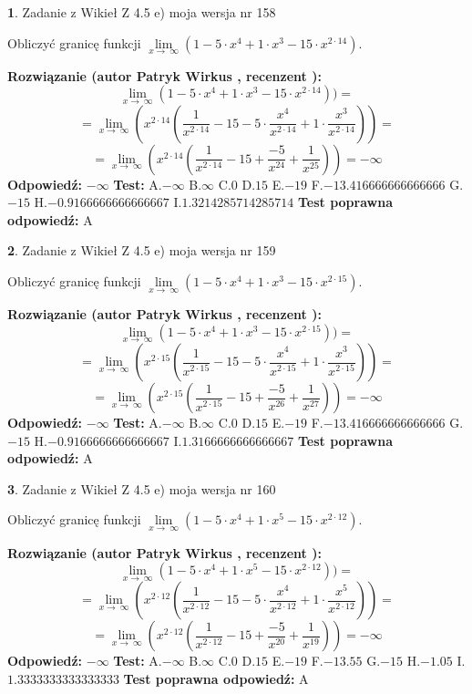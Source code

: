\documentclass[12pt, a4paper]{article}
\theoremstyle{definition} %
\newtheorem{zad}{}
\newcommand{\zadStart}[1]{\begin{zad}#1\newline}
\newcommand{\zadStop}{\end{zad}}
\newcommand{\rozwStart}[2]{\noindent \textbf{Rozwiązanie (autor #1 , recenzent #2): }\newline}
\newcommand{\rozwStop}{\newline}
\newcommand{\odpStart}{\noindent \textbf{Odpowiedź:}\newline}
\newcommand{\odpStop}{\newline}
\newcommand{\testStart}{\noindent \textbf{Test:}\newline}
\newcommand{\testStop}{\newline}
\newcommand{\kluczStart}{\noindent \textbf{Test poprawna odpowiedź:}\newline}
\newcommand{\kluczStop}{\newline}
\begin{document}
\zadStart{Zadanie z Wikieł Z 4.5 e) moja wersja nr 158}


Obliczyć granicę funkcji  $\lim\limits_{x\to\ \infty}(1 - 5 \cdot x^{4}+1 \cdot x^{3}- 15 \cdot x^{2\cdot14})$.
\zadStop
\rozwStart{Patryk Wirkus}{}
$$\lim\limits_{x\to\ \infty}(1 - 5 \cdot x^{4}+1 \cdot x^{3}- 15 \cdot x^{2\cdot14}))=$$
$$=\lim\limits_{x\to\ \infty}(x^{2\cdot14}(\frac{1}{x^{2\cdot14}}-15 -5 \cdot \frac{x^{4}}{x^{2\cdot14}}+1 \cdot \frac{x^{3}}{x^{2\cdot14}}))=$$
$$=\lim\limits_{x\to\ \infty}(x^{2\cdot14}(\frac{1}{x^{2\cdot14}}-15 + \frac{-5}{x^{24}}+ \frac{1}{x^{25}}))=-\infty$$
\rozwStop
\odpStart
$-\infty$
\odpStop
\testStart
A.$-\infty$ B.$\infty$ C.$0$ D.$15$ E.$-19$
F.$-13.416666666666666$ G.$-15$
H.$-0.9166666666666667$
I.$1.3214285714285714$
\testStop
\kluczStart
A
\kluczStop



\zadStart{Zadanie z Wikieł Z 4.5 e) moja wersja nr 159}


Obliczyć granicę funkcji  $\lim\limits_{x\to\ \infty}(1 - 5 \cdot x^{4}+1 \cdot x^{3}- 15 \cdot x^{2\cdot15})$.
\zadStop
\rozwStart{Patryk Wirkus}{}
$$\lim\limits_{x\to\ \infty}(1 - 5 \cdot x^{4}+1 \cdot x^{3}- 15 \cdot x^{2\cdot15}))=$$
$$=\lim\limits_{x\to\ \infty}(x^{2\cdot15}(\frac{1}{x^{2\cdot15}}-15 -5 \cdot \frac{x^{4}}{x^{2\cdot15}}+1 \cdot \frac{x^{3}}{x^{2\cdot15}}))=$$
$$=\lim\limits_{x\to\ \infty}(x^{2\cdot15}(\frac{1}{x^{2\cdot15}}-15 + \frac{-5}{x^{26}}+ \frac{1}{x^{27}}))=-\infty$$
\rozwStop
\odpStart
$-\infty$
\odpStop
\testStart
A.$-\infty$ B.$\infty$ C.$0$ D.$15$ E.$-19$
F.$-13.416666666666666$ G.$-15$
H.$-0.9166666666666667$
I.$1.3166666666666667$
\testStop
\kluczStart
A
\kluczStop



\zadStart{Zadanie z Wikieł Z 4.5 e) moja wersja nr 160}


Obliczyć granicę funkcji  $\lim\limits_{x\to\ \infty}(1 - 5 \cdot x^{4}+1 \cdot x^{5}- 15 \cdot x^{2\cdot12})$.
\zadStop
\rozwStart{Patryk Wirkus}{}
$$\lim\limits_{x\to\ \infty}(1 - 5 \cdot x^{4}+1 \cdot x^{5}- 15 \cdot x^{2\cdot12}))=$$
$$=\lim\limits_{x\to\ \infty}(x^{2\cdot12}(\frac{1}{x^{2\cdot12}}-15 -5 \cdot \frac{x^{4}}{x^{2\cdot12}}+1 \cdot \frac{x^{5}}{x^{2\cdot12}}))=$$
$$=\lim\limits_{x\to\ \infty}(x^{2\cdot12}(\frac{1}{x^{2\cdot12}}-15 + \frac{-5}{x^{20}}+ \frac{1}{x^{19}}))=-\infty$$
\rozwStop
\odpStart
$-\infty$
\odpStop
\testStart
A.$-\infty$ B.$\infty$ C.$0$ D.$15$ E.$-19$
F.$-13.55$ G.$-15$
H.$-1.05$
I.$1.3333333333333333$
\testStop
\kluczStart
A
\kluczStop
\end{document}

